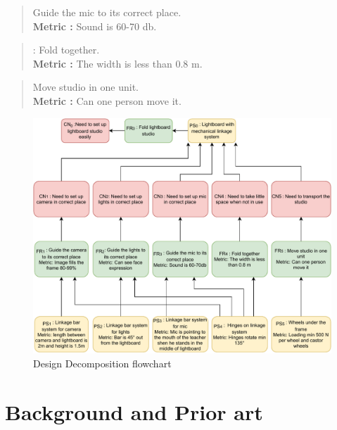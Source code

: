 \documentclass[a4paper]{jpconf}
\begin{document}
\begin{quote} 
	\textbf{} Guide the mic  to its correct place.
	\\ \textbf{Metric :} Sound is 60-70 db\cite{db}.
\end{quote}

\begin{quote} 
	\textbf{} :  Fold together.
	\\ \textbf{Metric :} The width is less than 0.8 m.
\end{quote}

\begin{quote} 
	\textbf{} Move studio in one unit.
	\\ \textbf{Metric :} Can one person move it.
\end{quote}


\begin{figure}[]
	\centering
	\includegraphics[width=1\textwidth]{matrix.pdf}
	\caption{Design Decomposition flowchart}\label{fig:matrix}
\end{figure}




\section{Background and Prior art}
\end{document}
